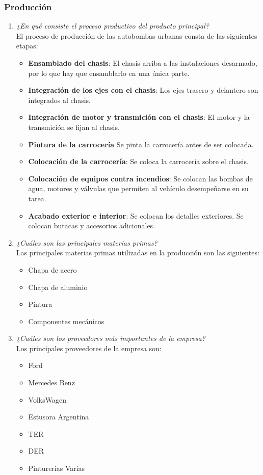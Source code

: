 \documentclass[a4paper,10pt]{article}
\begin{document}
\subsubsection{Producción}
			\begin{enumerate}[resume]
				\item \textit{¿En qué consiste el proceso productivo del producto principal?}\\	
				El proceso de producción de las autobombas urbanas consta de las siguientes etapas:
				\begin{itemize}
					\item \textbf{Ensamblado del chasis}: El chasis arriba a las instalaciones desarmado, por lo que hay que ensamblarlo en una única parte.
					\item \textbf{Integración de los ejes con el chasis}: Los ejes trasero y delantero son integrados al chasis.
					\item \textbf{Integración de motor y transmición con el chasis}: El motor y la transmición se fijan al chasis.
					\item \textbf{Pintura de la carrocería} Se pinta la carrocería antes de ser colocada.
					\item \textbf{Colocación de la carrocería}: Se coloca la carrocería sobre el chasis.
					\item \textbf{Colocación de equipos contra incendios}: Se colocan las bombas de agua, motores y válvulas que permiten al vehículo desempeñarse en su tarea.
					\item \textbf{Acabado exterior e interior}: Se colocan los detalles exteriores. Se colocan butacas y accesorios adicionales.
				\end{itemize}
				
				
				\item \textit{¿Cuáles son las principales materias primas?}\\	
				Las principales materias primas utilizadas en la producción son las siguientes:
				\begin{itemize}
					\item Chapa de acero
					\item Chapa de aluminio
					\item Pintura
					\item Componentes mecánicos
				\end{itemize}
				
				\item \textit{¿Cuáles son los proveedores más importantes de la empresa?}\\	
				Los principales proveedores de la empresa son:
				\begin{itemize}
					\item Ford
					\item Mercedes Benz
					\item VolksWagen
					\item Estusora Argentina
					\item TER
					\item DER
					\item Pinturerias Varias
				\end{itemize}
				

\end{enumerate}
\end{document}

